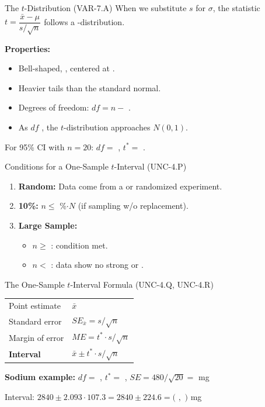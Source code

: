 \documentclass[10pt]{article}
\begin{document}
\begin{notesbox}{The $t$-Distribution (VAR-7.A)}
When we substitute $s$ for $\sigma$, the statistic $t = \dfrac{\bar x - \mu}{s/\sqrt{n}}$
follows a -distribution.

\textbf{Properties:}
\begin{itemize}
    \item Bell-shaped, , centered at .
    \item Heavier tails than the standard normal.
    \item Degrees of freedom: $df = n - $ .
    \item As $df$ , the $t$-distribution approaches $N(0, 1)$.
\end{itemize}

For 95\% CI with $n = 20$: $df = $ , $t^* = $ .
\end{notesbox}

\begin{notesbox}{Conditions for a One-Sample $t$-Interval (UNC-4.P)}
\begin{enumerate}
    \item \textbf{Random:} Data come from a  or randomized experiment.
    \item \textbf{10\%:} $n \le $ \%$ \cdot N$ (if sampling w/o replacement).
    \item \textbf{Large Sample:}
          \begin{itemize}
              \item $n \ge $ : condition met.
              \item $n < $ : data show no strong  or .
          \end{itemize}
\end{enumerate}
\end{notesbox}

\begin{notesbox}{The One-Sample $t$-Interval Formula (UNC-4.Q, UNC-4.R)}
\renewcommand{\arraystretch}{2}
\begin{tabularx}{\linewidth}{lX}
    Point estimate & $\bar x$ \\
    Standard error & $SE_{\bar x} = s/\sqrt{n}$ \\
    Margin of error & $ME = t^* \cdot s/\sqrt{n}$ \\
    \textbf{Interval} & $\bar x \pm t^* \cdot s/\sqrt{n}$ \\
\end{tabularx}

\textbf{Sodium example:} $df = $ , $t^* = $ ,
$SE = 480/\sqrt{20} = $  mg

Interval: $2840 \pm 2.093 \cdot 107.3 = 2840 \pm 224.6
= ($  $,$  $)$ mg
\end{notesbox}
\end{document}
